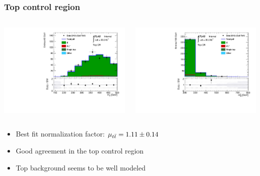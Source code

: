 \documentclass[10pt, svgnames]{beamer}
\begin{document}
\begin{frame}
  \frametitle{Top control region}
  \begin{columns}
    \begin{block}{\HT}
      \includegraphics[width=\textwidth]{figures/cr_top_ht_signal.pdf}
    \end{block}
    \begin{block}{\MBL}
      \includegraphics[width=\textwidth]{figures/cr_top_mbl_0.pdf}
    \end{block}
  \end{columns}
  \begin{itemize}
    \item Best fit normalization factor: $\mu_{t\bar{t}} = 1.11 \pm 0.14$
    \item Good agreement in the top control region
    \item Top background seems to be well modeled
  \end{itemize}
\end{frame}
\end{document}
